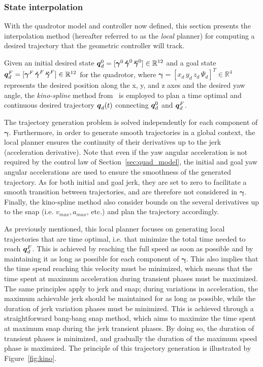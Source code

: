 \subsubsection{State interpolation}

With the quadrotor model and controller now defined, this section presents the interpolation method (hereafter referred to as the \emph{local} planner) for computing a desired trajectory that the geometric controller will track.

Given an initial desired state $\boldsymbol{q}_d^0 = [\boldsymbol{\gamma}^0 \, \boldsymbol{\Dot{\gamma}}^0 \, \boldsymbol{\Ddot{\gamma}}^0] \in \mathbb{R}^{12}$ and a goal state $\boldsymbol{q}_d^F = [\boldsymbol{\gamma}^F \, \boldsymbol{\Dot{\gamma}}^F \, \boldsymbol{\Ddot{\gamma}}^F] \in \mathbb{R}^{12}$ for the quadrotor, where $\boldsymbol{\gamma} = [x_{d} \, y_{d} \, z_{d} \, \Psi_{d}]^T \in \mathbb{R}^{4}$ represents the desired position along the x, y, and z axes and the desired yaw angle, the \emph{kino-spline} method from~\cite{cKino} is employed to plan a time optimal and continuous desired trajectory $\boldsymbol{q}_d(t)$ connecting $\boldsymbol{q}_d^0$ and $\boldsymbol{q}_d^F$. 

The trajectory generation problem is solved independently for each component of $\boldsymbol{\gamma}$.
Furthermore, in order to generate smooth trajectories in a global context, the local planner ensures the continuity of their derivatives up to the jerk (acceleration derivative). 
Note that even if the yaw angular acceleration is not required by the control law of Section~\ref{sec:quad_model}, the initial and goal yaw angular accelerations are used to ensure the smoothness of the generated trajectory. 
As for both initial and goal jerk, they are set to zero to facilitate a smooth transition between trajectories, and are therefore not considered in $\boldsymbol{\gamma}$.
Finally, the kino-spline method also consider bounds on the several derivatives up to the snap (i.e. $v_{max}, a_{max}$, etc.) and plan the trajectory accordingly.

As previously mentioned, this local planner focuses on generating local trajectories that are time optimal, i.e. that minimize the total time needed to reach $\boldsymbol{q}_d^F$.
This is achieved by reaching the full speed as soon as possible and by maintaining it as long as possible for each component of $\boldsymbol{\gamma}$.
This also implies that the time spend reaching this velocity must be minimized, which means that the time spent at maximum acceleration during transient phases must be maximized.
The same principles apply to jerk and snap; during variations in acceleration, the maximum achievable jerk should be maintained for as long as possible, while the duration of jerk variation phases must be minimized.
This is achieved through a straightforward bang-bang snap method, which aims to maximize the time spent at maximum snap during the jerk transient phases. 
By doing so, the duration of transient phases is minimized, and gradually the duration of the maximum speed phase is maximized.
The principle of this trajectory generation is illustrated by Figure~\ref{fig:kino}.

